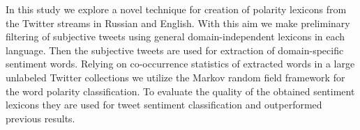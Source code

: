 In this study we explore a novel technique for creation of polarity lexicons from the Twitter streams in Russian and English. With this aim we make preliminary filtering of subjective tweets using general domain-independent lexicons in each language. Then the subjective tweets are used for extraction of domain-specific sentiment words. Relying on co-occurrence statistics of extracted words in a large unlabeled Twitter collections we utilize the Markov random field framework for the word polarity classification. To evaluate the quality of the obtained sentiment lexicons they are used for tweet sentiment classification and outperformed previous results.
